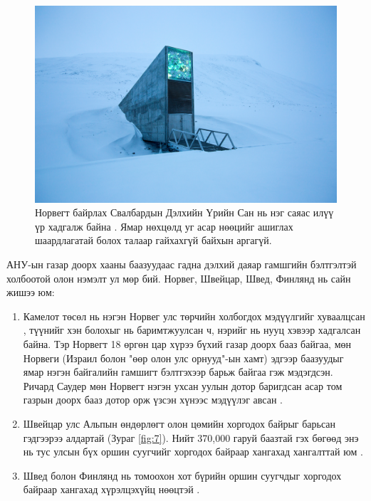 \documentclass[10pt,twocolumn,letterpaper]{article}
\begin{document}
\begin{figure}[t]
\begin{center}
   \includegraphics[width=1\linewidth]{svalbard.jpg}
\end{center}
   \caption{Норвегт байрлах Свалбардын Дэлхийн Үрийн Сан нь нэг саяас илүү үр хадгалж байна \cite{24}. Ямар нөхцөлд уг асар нөөцийг ашиглах шаардлагатай болох талаар гайхахгүй байхын аргагүй.}
\label{fig:8}
\label{fig:onecol}
\end{figure}

АНУ-ын газар доорх хааны баазуудаас гадна дэлхий даяар гамшгийн бэлтгэлтэй холбоотой олон нэмэлт ул мөр бий. Норвег, Швейцар, Швед, Финлянд нь сайн жишээ юм:

\begin{flushleft}
\begin{enumerate}
    \item Камелот төсөл нь нэгэн Норвег улс төрчийн холбогдох мэдүүлгийг хуваалцсан \cite{25,26}, түүнийг хэн болохыг нь баримтжуулсан ч, нэрийг нь нууц хэвээр хадгалсан байна. Тэр Норвегт 18 өргөн цар хүрээ бүхий газар доорх бааз байгаа, мөн Норвеги (Израил болон "өөр олон улс орнууд"-ын хамт) эдгээр баазуудыг ямар нэгэн байгалийн гамшигт бэлтгэхээр барьж байгаа гэж мэдэгдсэн. Ричард Саудер мөн Норвегт нэгэн ухсан уулын дотор баригдсан асар том газрын доорх бааз дотор орж үзсэн хүнээс мэдүүлэг авсан \cite{22}.
    \item Швейцар улс Альпын өндөрлөгт олон цөмийн хоргодох байрыг барьсан гэдгээрээ алдартай (Зураг \ref{fig:7}). Нийт 370,000 гаруй баазтай гэх бөгөөд энэ нь тус улсын бүх оршин суугчийг хоргодох байраар хангахад хангалттай юм \cite{27}.
    \item Швед болон Финлянд нь томоохон хот бүрийн оршин суугчдыг хоргодох байраар хангахад хүрэлцэхүйц нөөцтэй \cite{27}. 
\end{enumerate}
\end{flushleft}
\end{document}
